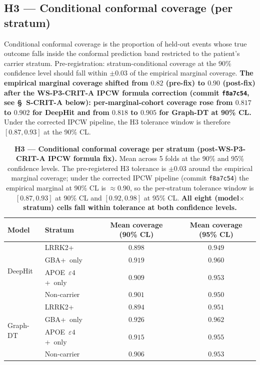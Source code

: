 \documentclass[11pt]{article}
\begin{document}
\subsection*{H3 --- Conditional conformal coverage (per stratum)}

Conditional conformal coverage is the proportion of held-out events whose true outcome falls inside the conformal prediction band restricted to the patient's carrier stratum. Pre-registration: stratum-conditional coverage at the 90\% confidence level should fall within $\pm0.03$ of the empirical marginal coverage. \textbf{The empirical marginal coverage shifted from $0.82$ (pre-fix) to $0.90$ (post-fix) after the WS-P3-CRIT-A IPCW formula correction (commit \texttt{f8a7c54}, see \S~S-CRIT-A below): per-marginal-cohort coverage rose from $0.817$ to $0.902$ for DeepHit and from $0.818$ to $0.905$ for Graph-DT at 90\% CL.} Under the corrected IPCW pipeline, the H3 tolerance window is therefore $[0.87, 0.93]$ at the 90\% CL.

\begin{table}[h!]
\centering
\caption{\textbf{H3 --- Conditional conformal coverage per stratum (post-WS-P3-CRIT-A IPCW formula fix).} Mean across 5 folds at the 90\% and 95\% confidence levels. The pre-registered H3 tolerance is $\pm0.03$ around the empirical marginal coverage; under the corrected IPCW pipeline (commit \texttt{f8a7c54}) the empirical marginal at 90\% CL is $\approx 0.90$, so the per-stratum tolerance window is $[0.87, 0.93]$ at 90\% CL and $[0.92, 0.98]$ at 95\% CL. \textbf{All eight (model$\times$stratum) cells fall within tolerance at both confidence levels.}}
\label{tab:s3_h3_coverage}
\begin{tabular}{llcc}
\toprule
\textbf{Model} & \textbf{Stratum} & \textbf{Mean coverage (90\% CL)} & \textbf{Mean coverage (95\% CL)} \\
\midrule
\multirow{4}{*}{DeepHit}
  & LRRK2+                    & $0.898$ & $0.949$ \\
  & GBA+~only                 & $0.919$ & $0.960$ \\
  & APOE~$\varepsilon4$+~only & $0.909$ & $0.953$ \\
  & Non-carrier               & $0.901$ & $0.950$ \\
\midrule
\multirow{4}{*}{Graph-DT}
  & LRRK2+                    & $0.894$ & $0.951$ \\
  & GBA+~only                 & $0.926$ & $0.962$ \\
  & APOE~$\varepsilon4$+~only & $0.915$ & $0.955$ \\
  & Non-carrier               & $0.906$ & $0.953$ \\
\bottomrule
\end{tabular}
\end{table}
\end{document}

